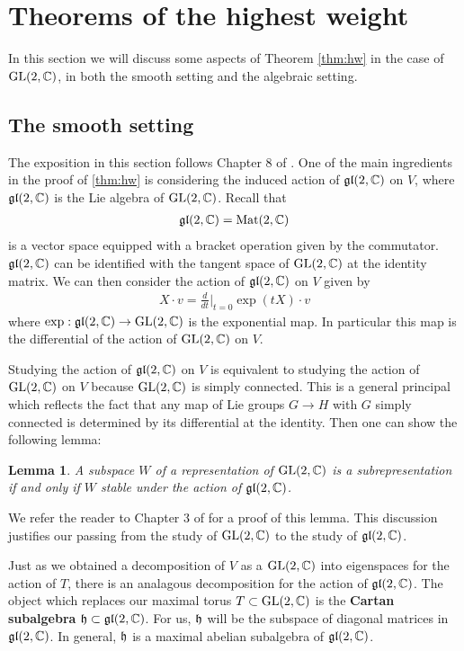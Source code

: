 \documentclass{amsart}
\numberwithin{equation}{section}
\theoremstyle{plain} %
\newtheorem{lemma}[equation]{Lemma}
\theoremstyle{definition}
\theoremstyle{remark}
\begin{document}
\section{Theorems of the highest weight}
In this section we will discuss some aspects of Theorem \ref{thm:hw} in the case of $\operatorname{GL}(2,\mathbb{C})$,
in both the smooth setting and the algebraic setting.

\subsection{The smooth setting}
The exposition in this section follows Chapter 8 of \cite{fulton}.
One of the main ingredients in the proof of \ref{thm:hw} is considering the induced action of $\operatorname{\mathfrak{gl}}(2,\mathbb{C})$ on $V$,
where $\operatorname{\mathfrak{gl}}(2,\mathbb{C})$ is the Lie algebra of $\operatorname{GL}(2,\mathbb{C})$. Recall that \begin{align*}
	\operatorname{\mathfrak{gl}}(2,\mathbb{C}) = \operatorname{Mat}(2,\mathbb{C})
\end{align*} is a vector space equipped with a bracket operation given by the commutator. $\operatorname{\mathfrak{gl}}(2,\mathbb{C})$
can be identified with the tangent space of $\operatorname{GL}(2,\mathbb{C})$ at the identity matrix. We can then consider the action of $\operatorname{\mathfrak{gl}}(2,\mathbb{C})$ on $V$ given by \begin{align*}
	X\cdot v = \frac{d}{dt}\bigg\vert_{t=0} \exp(tX)\cdot v
\end{align*} where $\exp: \operatorname{\mathfrak{gl}}(2,\mathbb{C})\to \operatorname{GL}(2,\mathbb{C})$ is the exponential map. In particular this map is the differential of the action of $\operatorname{GL}(2,\mathbb{C})$ on $V$.

\hfill

Studying the action of $\operatorname{\mathfrak{gl}}(2,\mathbb{C})$ on $V$ is equivalent to studying the action of $\operatorname{GL}(2,\mathbb{C})$ on $V$ because $\operatorname{GL}(2,\mathbb{C})$ is simply
connected. This is a general principal which reflects the fact that any map of Lie groups $G\to H$
with $G$ simply connected is determined by its differential at the identity. Then one can show the following lemma:
\begin{lemma}\label{lemma:liealg}
	A subspace $W$ of a representation of $\operatorname{GL}(2,\mathbb{C})$ is a subrepresentation if and only if $W$ stable under the action of $\operatorname{\mathfrak{gl}}(2,\mathbb{C})$.
\end{lemma}
We refer the reader to Chapter 3 of \cite{bourbaki} for a proof of this lemma.
This discussion justifies our passing from the study of $\operatorname{GL}(2,\mathbb{C})$ to the study of $\operatorname{\mathfrak{gl}}(2,\mathbb{C})$.

\hfill

Just as we obtained a decomposition of $V$ as a $\operatorname{GL}(2,\mathbb{C})$ into eigenspaces for the action of $T$,
there is an analagous decomposition for the action of $\operatorname{\mathfrak{gl}}(2,\mathbb{C})$.
The object which replaces our maximal torus $T\subset\operatorname{GL}(2,\mathbb{C})$ is the \textbf{Cartan subalgebra} $\mathfrak{h}\subset \operatorname{\mathfrak{gl}}(2,\mathbb{C})$.
For us, $\mathfrak{h}$ will be the subspace of diagonal matrices in $\operatorname{\mathfrak{gl}}(2,\mathbb{C})$. In general, $\mathfrak{h}$ is a maximal abelian subalgebra of $\operatorname{\mathfrak{gl}}(2,\mathbb{C})$.
\end{document}
